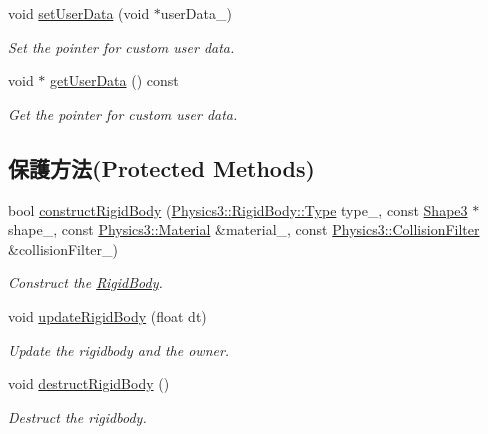 \begin{DoxyCompactItemize}
void \hyperlink{class_magnum_1_1_physics3_1_1_rigid_body_a1b6e80ead7db9a177d461b5866e9f5a1}{set\+User\+Data} (void $\ast$user\+Data\+\_\+)
\begin{DoxyCompactList}\small\item\em Set the pointer for custom user data. \end{DoxyCompactList}\item 
void $\ast$ \hyperlink{class_magnum_1_1_physics3_1_1_rigid_body_a58a60bc4aa2ed9dd209a03371f303d0d}{get\+User\+Data} () const 
\begin{DoxyCompactList}\small\item\em Get the pointer for custom user data. \end{DoxyCompactList}\end{DoxyCompactItemize}
\subsection*{保護方法(Protected Methods)}
\begin{DoxyCompactItemize}
\item 
bool \hyperlink{class_magnum_1_1_physics3_1_1_rigid_body_a8e1f6c5d8575dbac5b444ce04041ff27}{construct\+Rigid\+Body} (\hyperlink{class_magnum_1_1_physics3_1_1_rigid_body_a429aa4fb7256b083334c86cdcd0d6b31}{Physics3\+::\+Rigid\+Body\+::\+Type} type\+\_\+, const \hyperlink{class_magnum_1_1_shape3}{Shape3} $\ast$shape\+\_\+, const \hyperlink{class_magnum_1_1_physics3_1_1_material}{Physics3\+::\+Material} \&material\+\_\+, const \hyperlink{class_magnum_1_1_physics3_1_1_collision_filter}{Physics3\+::\+Collision\+Filter} \&collision\+Filter\+\_\+)
\begin{DoxyCompactList}\small\item\em Construct the \hyperlink{class_magnum_1_1_physics3_1_1_rigid_body}{Rigid\+Body}. \end{DoxyCompactList}\item 
void \hyperlink{class_magnum_1_1_physics3_1_1_rigid_body_ae5b00d6e2ba30c69459263846b84ea59}{update\+Rigid\+Body} (float dt)
\begin{DoxyCompactList}\small\item\em Update the rigidbody and the owner. \end{DoxyCompactList}\item 
void \hyperlink{class_magnum_1_1_physics3_1_1_rigid_body_aa20303aecff93264de0d7ee53524eebd}{destruct\+Rigid\+Body} ()\hypertarget{class_magnum_1_1_physics3_1_1_rigid_body_aa20303aecff93264de0d7ee53524eebd}{}\label{class_magnum_1_1_physics3_1_1_rigid_body_aa20303aecff93264de0d7ee53524eebd}

\begin{DoxyCompactList}\small\item\em Destruct the rigidbody. \end{DoxyCompactList}\end{DoxyCompactItemize}
